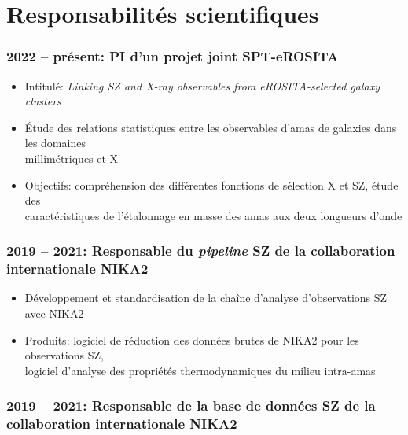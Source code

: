 \section{Responsabilités scientifiques}

\subsubsection{2022 -- présent: PI d'un projet joint SPT-eROSITA}

\begin{itemize}
    \setlength{\itemsep}{0pt}
    \item Intitulé: \textit{Linking SZ and X-ray observables from eROSITA-selected galaxy clusters}
    \item Étude des relations statistiques entre les observables d'amas de galaxies dans les domaines \\ millimétriques et X
    \item Objectifs: compréhension des différentes fonctions de sélection X et SZ, étude des \\ caractéristiques de l'étalonnage en masse des amas aux deux longueurs d'onde
\end{itemize} 

\subsubsection{2019 -- 2021: Responsable du \textit{pipeline} SZ de la collaboration internationale NIKA2}

\begin{itemize}
    \setlength{\itemsep}{0pt}
    \item Développement et standardisation de la chaîne d'analyse d'observations SZ avec NIKA2
    \item Produits: logiciel de réduction des données brutes de NIKA2 pour les observations SZ, \\ logiciel d'analyse des propriétés thermodynamiques du milieu intra-amas
\end{itemize} 
\subsubsection{2019 -- 2021: Responsable de la base de données SZ de la collaboration internationale NIKA2}